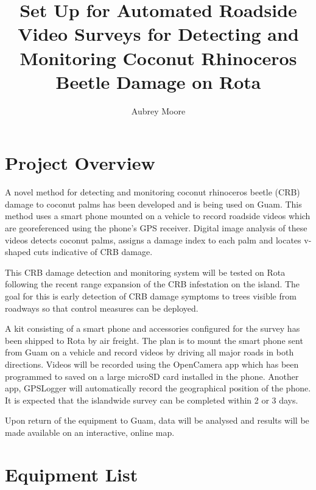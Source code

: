 \documentclass[12pt,letterpaper,english,bibliography=totocnumbered, abstract=on]{scrartcl}
\begin{document}
\titlehead{TECHNICAL REPORT}

\title{Set Up for Automated Roadside Video Surveys for Detecting and Monitoring Coconut Rhinoceros Beetle Damage on Rota}

\author{Aubrey Moore}

\maketitle


\newpage

\section{Project Overview}

A novel method for detecting and monitoring coconut rhinoceros beetle (CRB) damage to coconut palms has been developed and is being used on Guam. This method uses a smart phone mounted on a vehicle to record roadside videos which are georeferenced using the phone's GPS receiver.  Digital image analysis of these videos detects coconut palms, assigns a damage index to each palm and locates v-shaped cuts indicative of CRB damage.

This CRB damage detection and monitoring system will be tested on Rota following the recent range expansion of the CRB infestation on the island. The goal for this is early detection of CRB damage symptoms to trees visible from roadways so that control measures can be deployed. 

A kit consisting of a smart phone and accessories configured for the survey has been shipped to Rota by air freight. The plan is to mount the smart phone sent from Guam on a vehicle and record videos by driving all major roads in both directions. Videos will be recorded using the OpenCamera app which has been programmed to saved on a large microSD card installed in the phone. Another app, GPSLogger will automatically record the geographical position of the phone. It is expected that the islandwide survey can be completed within 2 or 3 days.

Upon return of the equipment to Guam, data will be analysed and results will be made available on an interactive, online map. 

\section{Equipment List}
\end{document}
